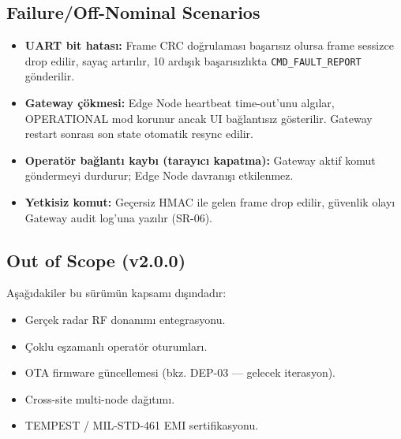 \subsection{Failure/Off-Nominal Scenarios}
\begin{itemize}
    \item \textbf{UART bit hatası:} Frame CRC doğrulaması başarısız olursa frame sessizce drop edilir, sayaç artırılır, 10 ardışık başarısızlıkta \texttt{CMD\_FAULT\_REPORT} gönderilir.
    \item \textbf{Gateway çökmesi:} Edge Node heartbeat time-out'unu algılar, OPERATIONAL mod korunur ancak UI bağlantısız gösterilir. Gateway restart sonrası son state otomatik resync edilir.
    \item \textbf{Operatör bağlantı kaybı (tarayıcı kapatma):} Gateway aktif komut göndermeyi durdurur; Edge Node davranışı etkilenmez.
    \item \textbf{Yetkisiz komut:} Geçersiz HMAC ile gelen frame drop edilir, güvenlik olayı Gateway audit log'una yazılır (SR-06).
\end{itemize}

\subsection{Out of Scope (v2.0.0)}
Aşağıdakiler bu sürümün kapsamı dışındadır:
\begin{itemize}
    \item Gerçek radar RF donanımı entegrasyonu.
    \item Çoklu eşzamanlı operatör oturumları.
    \item OTA firmware güncellemesi (bkz. DEP-03 — gelecek iterasyon).
    \item Cross-site multi-node dağıtımı.
    \item TEMPEST / MIL-STD-461 EMI sertifikasyonu.
\end{itemize}
